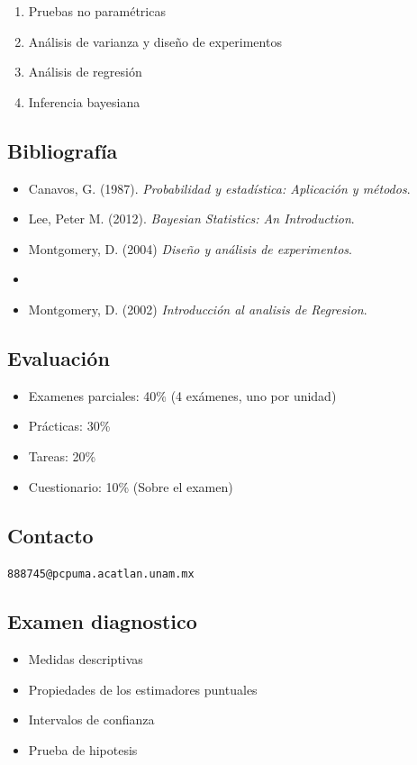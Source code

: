 \documentclass{article}
\begin{document}
\begin{enumerate}
    \item Pruebas no paramétricas
    \item Análisis de varianza y diseño de experimentos
    \item Análisis de regresión
    \item Inferencia bayesiana
\end{enumerate}

\subsection{Bibliografía}

\begin{itemize}
    \item Canavos, G. (1987). \textit{Probabilidad y estadística: Aplicación y métodos}.
    \item Lee, Peter M. (2012). \textit{Bayesian Statistics: An Introduction}.
    \item Montgomery, D. (2004) \textit{Diseño y análisis de experimentos}.
    \item \item Montgomery, D. (2002) \textit{Introducción al analisis de Regresion}.
\end{itemize}

\subsection{Evaluación}

\begin{itemize}
    \item Examenes parciales: 40\% (4 exámenes, uno por unidad)
    \item Prácticas: 30\%
    \item Tareas: 20\%
    \item Cuestionario: 10\% (Sobre el examen)
\end{itemize}

\subsection{Contacto}

\texttt{888745@pcpuma.acatlan.unam.mx}

\subsection{Examen diagnostico}
\begin{itemize}
    \item Medidas descriptivas
    \item Propiedades de los estimadores puntuales
    \item Intervalos de confianza
    \item Prueba de hipotesis
\end{itemize}
\end{document}

